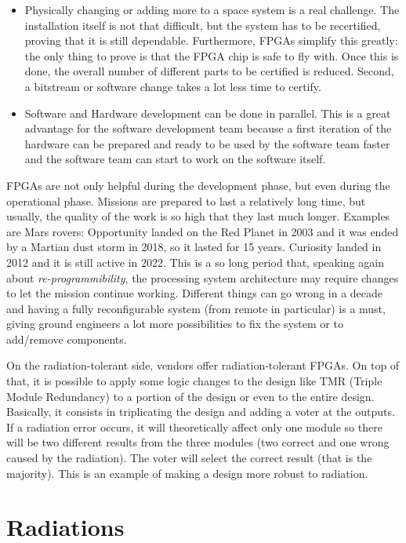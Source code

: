\begin{itemize}
    \item Physically changing or adding more to a space system is a real challenge. The installation itself is not that difficult, but the system has to be recertified, proving that it is still dependable. Furthermore, FPGAs simplify this greatly: the only thing to prove is that the FPGA chip is safe to fly with. Once this is done, the overall number of different parts to be certified is reduced. Second, a bitstream or software change takes a lot less time to certify.
    \item Software and Hardware development can be done in parallel. This is a great advantage for the software development team because a first iteration of the hardware can be prepared and ready to be used by the software team faster and the software team can start to work on the software itself.
\end{itemize}

FPGAs are not only helpful during the development phase, but even during the operational phase. Missions are prepared to last a relatively long time, but usually, the quality of the work is so high that they last much longer. Examples are Mars rovers: Opportunity landed on the Red Planet in 2003 and it was ended by a Martian dust storm in 2018, so it lasted for 15 years. Curiosity landed in 2012 and it is still active in 2022. This is a so long period that, speaking again about \textit{re-programmibility}, the processing system architecture may require changes to let the mission continue working. Different things can go wrong in a decade and having a fully reconfigurable system (from remote in particular) is a must, giving ground engineers a lot more possibilities to fix the system or to add/remove components. \bigskip

On the radiation-tolerant side, vendors offer radiation-tolerant FPGAs. On top of that, it is possible to apply some logic changes to the design like TMR (Triple Module Redundancy) to a portion of the design or even to the entire design. Basically, it consists in triplicating the design and adding a voter at the outputs. If a radiation error occurs, it will theoretically affect only one module so there will be two different results from the three modules (two correct and one wrong caused by the radiation). The voter will select the correct result (that is the majority). This is an example of making a design more robust to radiation.\bigskip

\section{Radiations}

